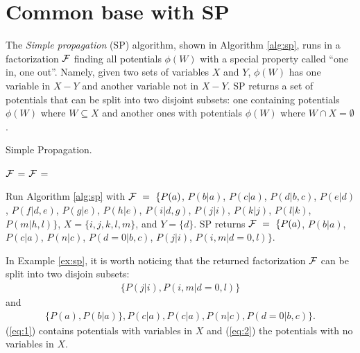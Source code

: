 \section{Common base with SP}
\label{sec:common}

The \emph{Simple propagation} (SP) algorithm, shown in Algorithm \ref{alg:sp}, runs in a factorization ${\cal F}$ finding all potentials $\phi(W)$ with a special property called ``one in, one out''.
Namely, given two sets of variables $X$ and $Y$, $\phi(W)$ has one variable in $X-Y$ and another variable not in $X-Y$.
SP returns a set of potentials that can be split into two disjoint subsets: one containing potentials $\phi(W)$ where $W \subseteq X$ and another ones with potentials $\phi(W)$ where $W \cap X = \emptyset$.

\begin{algorithm}[htb]
    \caption{Simple Propagation.}
    \label{alg:sp}
    \begin{algorithmic}[1]
        \label{alg:sp_in_out}
        	\State ${\cal F}$ =  \label{alg:sp_barren}
            \State ${\cal F}$ =  \label{alg:sp_sum_out}
        \EndWhile
    \EndProcedure
    \end{algorithmic}
\end{algorithm}

\begin{example}
Run Algorithm \ref{alg:sp} with ${\cal F} ~=~ \{P(a)$, $P(b|a)$, $P(c|a)$, $P(d|b,c)$, $P(e|d)$, $P(f|d,e)$, $P(g|e)$, $P(h|e)$, $P(i|d,g)$, $P(j|i)$, $P(k|j)$, $P(l|k)$, $P(m|h,l)\}$, $X = \{i,j,k,l,m\}$, and $Y = \{d\}$.
SP returns ${\cal F} ~=~ \{P(a)$, $P(b|a)$, $P(c|a)$, $P(n|c)$, $P(d=0|b,c)$, $P(j|i)$, $P(i,m|d=0,l)\}$.
\label{ex:sp}
\end{example}

In Example \ref{ex:sp}, it is worth noticing that the returned factorization ${\cal F}$ can be split into two disjoin subsets: 
\begin{align}
	\{ P(j|i), P(i,m|d=0,l) \}
	\label{eq:1}
\end{align}
and
\begin{align}
	\{ P(a), P(b|a)\}, P(c|a), P(c|a), P(n|c), P(d=0|b,c) \}.
	\label{eq:2}
\end{align}
(\ref{eq:1}) contains potentials with variables in $X$ and ({\ref{eq:2}}) the potentials with no variables in $X$.


